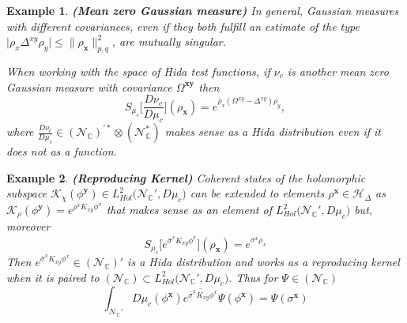 \documentclass{elsarticle}%
\newtheorem{example}{Example}%
\begin{document}
\begin{example}{\bf (Mean zero Gaussian measure)}
\label{ex:meanZeroGaussian} In general, Gaussian measures with different covariances, even if they both fulfill an estimate of the type $\lvert\rho_x\Delta^{xy}\rho_y \rvert \leq  \| \rho_{\mathbf{x}} \|_{p,q}^2 $, are mutually singular.  

 When working with the space of Hida test functions, if $\nu_c$ is
 another mean zero Gaussian measure with covariance $\Omega^{\mathbf{xy}}$ then 
$$S_{\mu_c}\Big[\frac{D\nu_c}{D\mu_c}\Big](\rho_\mathbf{x})=e^{\bar\rho_x(\Omega^{xy}-\Delta^{xy})\rho_y},$$
where $\frac{D\nu_c}{D\mu_c}\in (\mathcal{N}_{\mathbb{C}})^{\prime *}\otimes (\mathcal{N}_\mathbb{C}^*)$ makes sense as a Hida distribution even if it does not  as a function.  
\end{example}

\begin{example}{\bf (Reproducing Kernel)}
    \label{ex:repKernel} Coherent states of the holomorphic subspace $\mathcal{K}_{\chi}(\phi^{\mathbf{y}})\in L^2_{Hol}\big({\mathcal{N}_{\mathbb{C}}'},D\mu_c\big)$ can be extended to elements $\rho^{\mathbf{x}}\in \mathcal{H}_\Delta$ as $ \mathcal{K}_\rho(\phi^{\mathbf{y}})=e^{\rho^xK_{xy}\phi^x}$ that makes sense as an element of  $L^2_{Hol}\big({\mathcal{N}_{\mathbb{C}}'},D\mu_c\big)$ but, moreover 
    $$S_{\mu_c}\Big[ e^{\bar\sigma^xK_{xy}\phi^x}\Big](\rho_\mathbf{x})=e^{\overline{\sigma^x\rho_x}}$$
    Then  $e^{\bar\sigma^xK_{xy}\phi^x}\in (\mathcal{N}_{\mathbb{C}})'$ 
    is a Hida distribution and works as a reproducing kernel when it is paired to $(\mathcal{N}_{\mathbb{C}})\subset L^2_{Hol}\big({\mathcal{N}_{\mathbb{C}}'},D\mu_c\big)$. Thus  for $\Psi\in  (\mathcal{N}_{\mathbb{C}})$
    \begin{equation}
    \label{eq:rpekernelHida}
    \int_{\mathcal{N}_{\mathbb{C}}'}D\mu_c(\phi^{\mathbf{x}})\overline{e^{\bar\sigma^xK_{xy}\phi^x}}\Psi(\phi^{\mathbf{x}})= \Psi(\sigma^\mathbf{x})
    \end{equation}
    \end{example}

    
    
\end{document}
